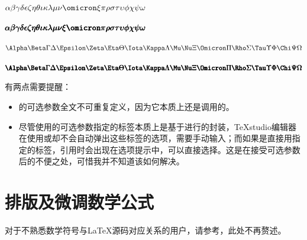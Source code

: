 \documentclass[doctor, vlined, ]{DissertUESTC}
\begin{document}
	$ \alpha \beta \gamma \delta \epsilon \zeta \eta \theta \iota \kappa \lambda \mu \nu \omicron \xi \pi \rho \sigma \tau \upsilon \phi \chi \psi \omega$

	$ \boldsymbol{\alpha} \boldsymbol{\beta} \boldsymbol{\gamma} \boldsymbol{\delta} \boldsymbol{\epsilon} \boldsymbol{\zeta} \boldsymbol{\eta} \boldsymbol{\theta} \boldsymbol{\iota} \boldsymbol{\kappa} \boldsymbol{\lambda} \boldsymbol{\mu} \boldsymbol{\nu} \boldsymbol{\xi} \boldsymbol{\omicron} \boldsymbol{\pi} \boldsymbol{\rho} \boldsymbol{\sigma} \boldsymbol{\tau} \boldsymbol{\upsilon} \boldsymbol{\phi} \boldsymbol{\chi} \boldsymbol{\psi} \boldsymbol{\omega}$

	$ \Alpha \Beta \Gamma \Delta \Epsilon \Zeta \Eta \Theta \Iota \Kappa \Lambda \Mu \Nu \Xi \Omicron \Pi \Rho \Sigma \Tau \Upsilon \Phi \Chi \Psi \Omega$
	
	$ \boldsymbol{\Alpha} \boldsymbol{\Beta} \boldsymbol{\Gamma} \boldsymbol{\Delta} \boldsymbol{\Epsilon} \boldsymbol{\Zeta} \boldsymbol{\Eta} \boldsymbol{\Theta} \boldsymbol{\Iota} \boldsymbol{\Kappa} \boldsymbol{\Lambda} \boldsymbol{\Mu} \boldsymbol{\Nu} \boldsymbol{\Xi} \boldsymbol{\Omicron} \boldsymbol{\Pi} \boldsymbol{\Rho} \boldsymbol{\Sigma} \boldsymbol{\Tau} \boldsymbol{\Upsilon} \boldsymbol{\Phi} \boldsymbol{\Chi} \boldsymbol{\Psi} \boldsymbol{\Omega}$
	
	有两点需要提醒：
	\begin{itemize}
		\item {}的可选参数全文不可重复定义，因为它本质上还是调用的。
		\item 尽管使用的可选参数指定的标签本质上是基于进行的封装，TeXstudio编辑器在使用或却不会自动弹出这些标签的选项，需要手动输入；而如果是直接用指定的标签，引用时会出现在选项提示中，可以直接选择。这是在接受可选参数后的不便之处，可惜我并不知道该如何解决。
	\end{itemize}
	
	
	\section{排版及微调数学公式}

	对于不熟悉数学符号与LaTeX源码对应关系的用户，请参考\href{https://www.cnblogs.com/1024th/p/11623258.html}{\color{DarkRed}}，此处不再赘述。
\end{document}
